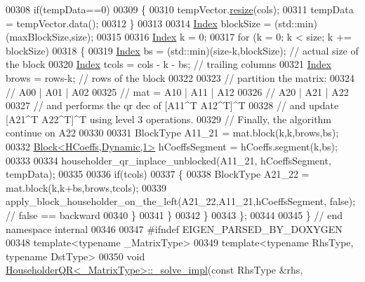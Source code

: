 \begin{DoxyCode}
00308     \textcolor{keywordflow}{if}(tempData==0)
00309     \{
00310       tempVector.\hyperlink{class_eigen_1_1_plain_object_base_a99d9054ee2d5a40c6e00ded0265e9cea}{resize}(cols);
00311       tempData = tempVector.data();
00312     \}
00313 
00314     \hyperlink{namespace_eigen_a62e77e0933482dafde8fe197d9a2cfde}{Index} blockSize = (std::min)(maxBlockSize,size);
00315 
00316     \hyperlink{namespace_eigen_a62e77e0933482dafde8fe197d9a2cfde}{Index} k = 0;
00317     \textcolor{keywordflow}{for} (k = 0; k < size; k += blockSize)
00318     \{
00319       \hyperlink{namespace_eigen_a62e77e0933482dafde8fe197d9a2cfde}{Index} bs = (std::min)(size-k,blockSize);  \textcolor{comment}{// actual size of the block}
00320       \hyperlink{namespace_eigen_a62e77e0933482dafde8fe197d9a2cfde}{Index} tcols = cols - k - bs;              \textcolor{comment}{// trailing columns}
00321       \hyperlink{namespace_eigen_a62e77e0933482dafde8fe197d9a2cfde}{Index} brows = rows-k;                     \textcolor{comment}{// rows of the block}
00322 
00323       \textcolor{comment}{// partition the matrix:}
00324       \textcolor{comment}{//        A00 | A01 | A02}
00325       \textcolor{comment}{// mat  = A10 | A11 | A12}
00326       \textcolor{comment}{//        A20 | A21 | A22}
00327       \textcolor{comment}{// and performs the qr dec of [A11^T A12^T]^T}
00328       \textcolor{comment}{// and update [A21^T A22^T]^T using level 3 operations.}
00329       \textcolor{comment}{// Finally, the algorithm continue on A22}
00330 
00331       BlockType A11\_21 = mat.block(k,k,brows,bs);
00332       \hyperlink{group___core___module_class_eigen_1_1_block}{Block<HCoeffs,Dynamic,1>} hCoeffsSegment = hCoeffs.segment(k,bs);
00333 
00334       householder\_qr\_inplace\_unblocked(A11\_21, hCoeffsSegment, tempData);
00335 
00336       \textcolor{keywordflow}{if}(tcols)
00337       \{
00338         BlockType A21\_22 = mat.block(k,k+bs,brows,tcols);
00339         apply\_block\_householder\_on\_the\_left(A21\_22,A11\_21,hCoeffsSegment, \textcolor{keyword}{false}); \textcolor{comment}{// false == backward}
00340       \}
00341     \}
00342   \}
00343 \};
00344 
00345 \} \textcolor{comment}{// end namespace internal}
00346 
00347 \textcolor{preprocessor}{#ifndef EIGEN\_PARSED\_BY\_DOXYGEN}
00348 \textcolor{keyword}{template}<\textcolor{keyword}{typename} \_MatrixType>
00349 \textcolor{keyword}{template}<\textcolor{keyword}{typename} RhsType, \textcolor{keyword}{typename} DstType>
00350 \textcolor{keywordtype}{void} \hyperlink{group___q_r___module_class_eigen_1_1_householder_q_r}{HouseholderQR<\_MatrixType>::\_solve\_impl}(\textcolor{keyword}{const} RhsType &rhs, 

\end{DoxyCode}
